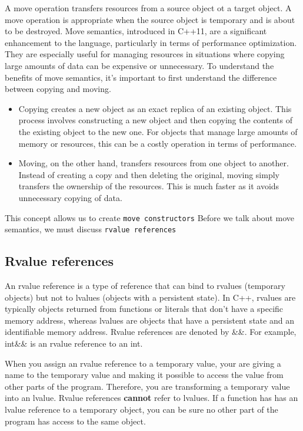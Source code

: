 \documentclass{report}
\begin{document}
    \pagebreak
    \bigbreak \noindent 
    \begin{concept}
       A move operation transfers resources from a source object ot a target object. A move operation is appropriate when the source object is temporary and is about to be destroyed. 
       \bigbreak \noindent 
        Move semantics, introduced in C++11, are a significant enhancement to the language, particularly in terms of performance optimization. They are especially useful for managing resources in situations where copying large amounts of data can be expensive or unnecessary. To understand the benefits of move semantics, it's important to first understand the difference between copying and moving.
        \begin{itemize}
            \item Copying creates a new object as an exact replica of an existing object. This process involves constructing a new object and then copying the contents of the existing object to the new one. For objects that manage large amounts of memory or resources, this can be a costly operation in terms of performance.
            \item Moving, on the other hand, transfers resources from one object to another. Instead of creating a copy and then deleting the original, moving simply transfers the ownership of the resources. This is much faster as it avoids unnecessary copying of data.
        \end{itemize}
        \bigbreak \noindent 
        This concept allows us to create \texttt{move constructors}
        \bigbreak \noindent 
        Before we talk about move semantics, we must discuss \texttt{rvalue references}
    \end{concept}
    \bigbreak \noindent 
    \subsection{Rvalue references}
    \bigbreak \noindent 
    An rvalue reference is a type of reference that can bind to rvalues (temporary objects) but not to lvalues (objects with a persistent state). In C++, rvalues are typically objects returned from functions or literals that don't have a specific memory address, whereas lvalues are objects that have a persistent state and an identifiable memory address.
    \bigbreak \noindent 
    Rvalue references are denoted by \&\&. For example, int\&\& is an rvalue reference to an int.
    \bigbreak \noindent 
    \begin{notebox}
        When you assign an rvalue reference to a temporary value, your are giving a name to the temporary value and making it possible to access the value from other parts of the program. Therefore, you are transforming a temporary value into an lvalue. Rvalue references \textbf{cannot} refer to lvalues.
        \bigbreak \noindent 
        If a function has has an lvalue reference to a temporary object, you can be sure no other part of the program has access to the same object.
    \end{notebox}
\end{document}
